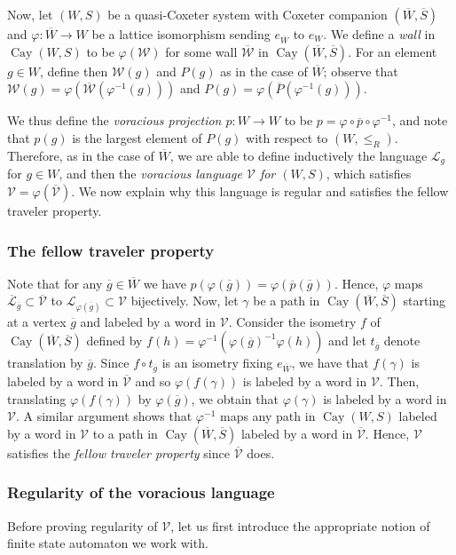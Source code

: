 \documentclass[A4paper, oneside]{amsart}
\newcommand{\id}{\textit{e}}
\newcommand{\Cay}{\operatorname{Cay}}
\newcommand{\W}{\mathcal{W}}
\newcommand{\V}{\mathcal{V}}
\newcommand{\LL}{\mathcal{L}}
\theoremstyle{definition}
\begin{document}
 \smallskip
 Now, let $(W,S)$ be a quasi-Coxeter system with Coxeter companion $(\overline{W}, \overline{S})$ and $\varphi : \overline{W} \to W$ be a lattice isomorphism sending $\id_{\overline{W}}$ to $\id_W$. We define a \emph{wall} in $\Cay(W,S)$ to be $\varphi(\W)$ for some wall $\overline{\W} $ in $\Cay(\overline{W}, \overline{S})$. For an element $g \in W$, define then $\W(g)$ and $P(g)$ as in the case of $\overline{W}$; observe that $\W(g) = \varphi(\overline{\W}(\varphi^{-1}(g)))$ and $P(g) = \varphi(\overline{P}(\varphi^{-1}(g)))$. 
 
 We thus define the \emph{voracious projection $p:W\to W$} to be $p = \varphi\circ\overline{p}\circ\varphi^{-1}$, and note that $p(g)$ is the largest element of $P(g)$ with respect to $(W,\leq_R)$. Therefore, as in the case of $\overline{W}$, we are able to define inductively the language $\mathcal{L}_g$ for $g\in W$, and then  the \emph{voracious language $\V$ for $(W,S)$}, which satisfies  $\V=\varphi(\overline{\V})$.  We now explain why this language is regular and satisfies the fellow traveler property. 
 
 \subsubsection*{The fellow traveler property} Note that for any $\overline{g} \in \overline{W}$ we have $p(\varphi(\overline{g})) = \varphi(\overline{p}(\overline{g}))$. Hence, $\varphi$ maps $\overline{\LL}_{\overline{g}} \subset \overline{\V}$ to $\LL_{\varphi(\overline{g})} \subset \V$ bijectively. Now, let $\gamma$ be a path in $\Cay(\overline{W}, \overline{S})$ starting at a vertex $\overline{g}$ and labeled by a word in $\V$. Consider the isometry $f$ of $\Cay(\overline{W}, \overline{S})$ defined by $f(h) = \varphi^{-1}(\varphi(\overline{g})^{-1}\varphi(h))$ and let $t_{\overline{g}}$ denote translation by $\overline{g}$. Since $f \circ t_{\overline{g}}$ is an isometry fixing $\id_{\overline{W}}$, we have that $f(\gamma)$ is labeled by a word in $\overline{\V}$ and so $\varphi(f(\gamma))$ is labeled by a word in $\V$. Then, translating $\varphi(f(\gamma))$ by $\varphi(\overline{g})$, we obtain that $\varphi(\gamma)$ is labeled by a word in $\V$. A similar argument shows that $\varphi^{-1}$ maps any path in $\Cay(W,S)$ labeled by a word in $\V$ to a path in $\Cay(\overline{W}, \overline{S})$ labeled by a word in $\overline{\V}$. Hence, $\V$ satisfies the \emph{fellow traveler property} since $\overline{\V}$ does.
 
  \subsubsection*{Regularity of the voracious language}  Before proving regularity of $\V$, let us first introduce the appropriate notion of finite state automaton we work with. 
 
\end{document}
